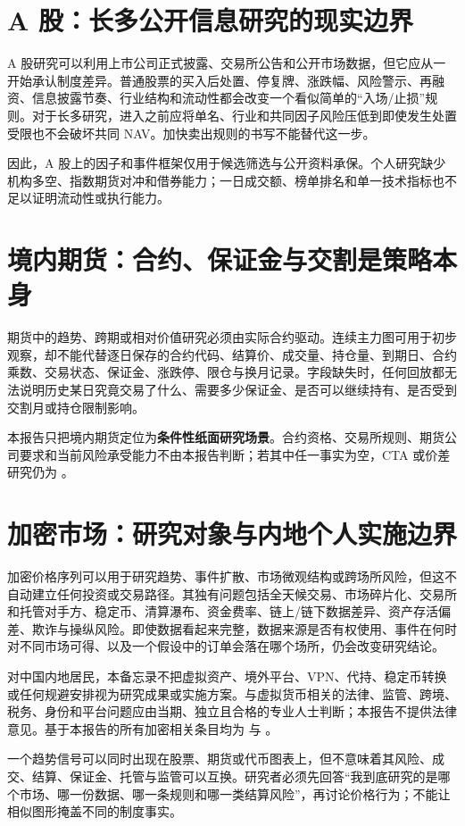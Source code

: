 \section{A 股：长多公开信息研究的现实边界}

A 股研究可以利用上市公司正式披露、交易所公告和公开市场数据，但它应从一开始承认制度差异。普通股票的买入后处置、停复牌、涨跌幅、风险警示、再融资、信息披露节奏、行业结构和流动性都会改变一个看似简单的“入场/止损”规则。对于长多研究，进入之前应将单名、行业和共同因子风险压低到即使发生处置受限也不会破坏共同 NAV。加快卖出规则的书写不能替代这一步。

因此，A 股上的因子和事件框架仅用于候选筛选与公开资料承保。个人研究缺少机构多空、指数期货对冲和借券能力；一日成交额、榜单排名和单一技术指标也不足以证明流动性或执行能力。

\section{境内期货：合约、保证金与交割是策略本身}

期货中的趋势、跨期或相对价值研究必须由实际合约驱动。连续主力图可用于初步观察，却不能代替逐日保存的合约代码、结算价、成交量、持仓量、到期日、合约乘数、交易状态、保证金、涨跌停、限仓与换月记录。字段缺失时，任何回放都无法说明历史某日究竟交易了什么、需要多少保证金、是否可以继续持有、是否受到交割月或持仓限制影响。

本报告只把境内期货定位为\textbf{条件性纸面研究场景}。合约资格、交易所规则、期货公司要求和当前风险承受能力不由本报告判断；若其中任一事实为空，CTA 或价差研究仍为 \qzero{}。

\section{加密市场：研究对象与内地个人实施边界}

加密价格序列可以用于研究趋势、事件扩散、市场微观结构或跨场所风险，但这不自动建立任何投资或交易路径。其独有问题包括全天候交易、市场碎片化、交易所和托管对手方、稳定币、清算瀑布、资金费率、链上/链下数据差异、资产存活偏差、欺诈与操纵风险。即使数据看起来完整，数据来源是否有权使用、事件在何时对不同市场可得、以及一个假设中的订单会落在哪个场所，仍会改变研究结论。

对中国内地居民，本备忘录不把虚拟资产、境外平台、VPN、代持、稳定币转换或任何规避安排视为研究成果或实施方案。与虚拟货币相关的法律、监管、跨境、税务、身份和平台问题应由当期、独立且合格的专业人士判断；本报告不提供法律意见。基于本报告的所有加密相关条目均为 \researchonly{} 与 \qzero{}。

\begin{riskbox}[同一“趋势”不等于同一种风险]
一个趋势信号可以同时出现在股票、期货或代币图表上，但不意味着其风险、成交、结算、保证金、托管与监管可以互换。研究者必须先回答“我到底研究的是哪个市场、哪一份数据、哪一条规则和哪一类结算风险”，再讨论价格行为；不能让相似图形掩盖不同的制度事实。
\end{riskbox}
